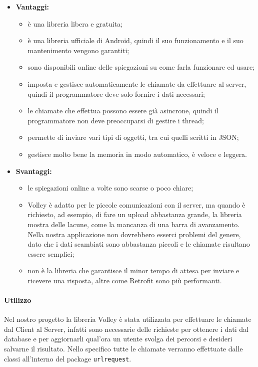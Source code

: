 	\begin{itemize}
		\item \textbf{Vantaggi:}
			\begin{itemize}
				\item è una libreria libera e gratuita;
				\item è una libreria ufficiale di Android, quindi il suo funzionamento e il suo mantenimento vengono garantiti;
				\item sono disponibili online delle spiegazioni su come farla funzionare ed usare;
				\item imposta e gestisce automaticamente le chiamate da effettuare al server, quindi il programmatore deve solo fornire i dati necessari;
				\item le chiamate che effettua possono essere già asincrone, quindi il programmatore non deve preoccuparsi di gestire i thread;
				\item permette di inviare vari tipi di oggetti, tra cui quelli scritti in JSON;
				\item gestisce molto bene la memoria in modo automatico, è veloce e leggera.
			\end{itemize}
		\item \textbf{Svantaggi:}
			\begin{itemize}
				\item le spiegazioni online a volte sono scarse o poco chiare;
				\item Volley è adatto per le piccole comunicazioni con il server, ma quando è richiesto, ad esempio, di fare un upload abbastanza grande, la libreria mostra delle lacune, come la mancanza di una barra di avanzamento. Nella nostra applicazione non dovrebbero esserci problemi del genere, dato che i dati scambiati sono abbastanza piccoli e le chiamate risultano essere semplici;
				\item non è la libreria che garantisce il minor tempo di attesa per inviare e ricevere una risposta, altre come Retrofit sono più performanti.
			\end{itemize}
	\end{itemize}
	\paragraph{Utilizzo}
	Nel nostro progetto la libreria Volley è stata utilizzata per effettuare le chiamate dal Client al Server, infatti sono necessarie delle richieste per ottenere i dati dal database e per aggiornarli qual'ora un utente svolga dei percorsi e desideri salvarne il risultato.
	Nello specifico tutte le chiamate verranno effettuate dalle classi all'interno del package \texttt{urlrequest}.


